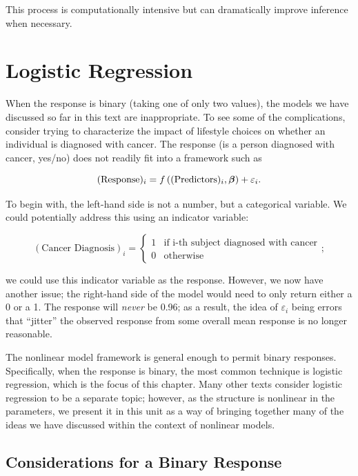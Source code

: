 \documentclass[
]{book}
\theoremstyle{plain}
\theoremstyle{mydefn}
\theoremstyle{myexmpl}
\theoremstyle{remark}
\begin{document}
This process is computationally intensive but can dramatically improve inference when necessary.

\hypertarget{nlm-logistic}{%
\chapter{Logistic Regression}\label{nlm-logistic}}

When the response is binary (taking one of only two values), the models we have discussed so far in this text are inappropriate. To see some of the complications, consider trying to characterize the impact of lifestyle choices on whether an individual is diagnosed with cancer. The response (is a person diagnosed with cancer, yes/no) does not readily fit into a framework such as

\[(\text{Response})_i = f\left((\text{Predictors})_i, \boldsymbol{\beta}\right) + \varepsilon_i.\]

To begin with, the left-hand side is not a number, but a categorical variable. We could potentially address this using an indicator variable:

\[(\text{Cancer Diagnosis})_i = \begin{cases} 1 & \text{if i-th subject diagnosed with cancer} \\ 0 & \text{otherwise} \end{cases};\]

we could use this indicator variable as the response. However, we now have another issue; the right-hand side of the model would need to only return either a 0 or a 1. The response will \emph{never} be 0.96; as a result, the idea of \(\varepsilon_i\) being errors that ``jitter'' the observed response from some overall mean response is no longer reasonable.

The nonlinear model framework is general enough to permit binary responses. Specifically, when the response is binary, the most common technique is logistic regression, which is the focus of this chapter. Many other texts consider logistic regression to be a separate topic; however, as the structure is nonlinear in the parameters, we present it in this unit as a way of bringing together many of the ideas we have discussed within the context of nonlinear models.

\hypertarget{considerations-for-a-binary-response}{%
\section{Considerations for a Binary Response}\label{considerations-for-a-binary-response}}
\end{document}
